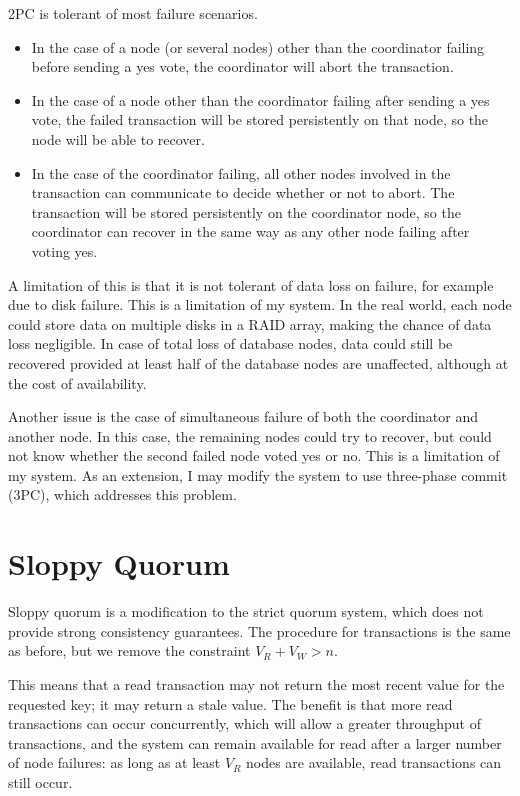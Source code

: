 \documentclass[12pt,a4paper,twoside,openright]{report}
\begin{document}
2PC is tolerant of most failure scenarios.

\begin{itemize}
  \item
  In the case of a node (or several nodes) other than the coordinator failing before sending a yes vote, the coordinator will abort the transaction.

  \item
  In the case of a node other than the coordinator failing after sending a yes vote, the failed transaction will be stored persistently on that node, so the node will be able to recover.

  \item
  In the case of the coordinator failing, all other nodes involved in the transaction can communicate to decide whether or not to abort. The transaction will be stored persistently on the coordinator node, so the coordinator can recover in the same way as any other node failing after voting yes.

\end{itemize}

A limitation of this is that it is not tolerant of data loss on failure, for example due to disk failure. This is a limitation of my system. In the real world, each node could store data on multiple disks in a RAID array, making the chance of data loss negligible. In case of total loss of database nodes, data could still be recovered provided at least half of the database nodes are unaffected, although at the cost of availability.

Another issue is the case of simultaneous failure of both the coordinator and another node. In this case, the remaining nodes could try to recover, but could not know whether the second failed node voted yes or no. This is a limitation of my system. As an extension, I may modify the system to use three-phase commit (3PC), which addresses this problem.

\section{Sloppy Quorum}

Sloppy quorum is a modification to the strict quorum system, which does not provide strong consistency guarantees. The procedure for transactions is the same as before, but we remove the constraint $V_R + V_W > n$.

This means that a read transaction may not return the most recent value for the requested key; it may return a stale value. The benefit is that more read transactions can occur concurrently, which will allow a greater throughput of transactions, and the system can remain available for read after a larger number of node failures: as long as at least $V_R$ nodes are available, read transactions can still occur.
\end{document}
